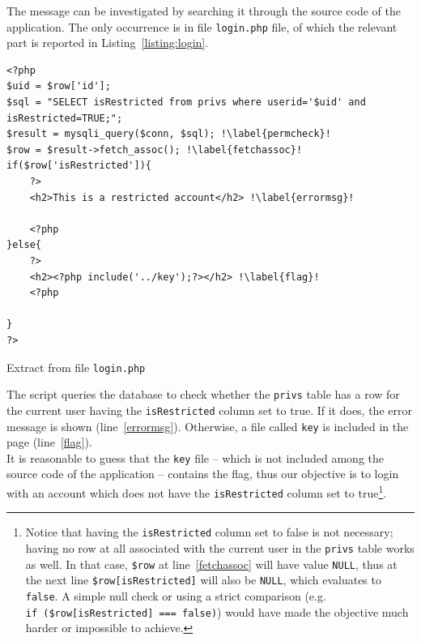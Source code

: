 The message can be investigated by searching it through the source code of the application. The only occurrence is in file \texttt{login.php} file, of which the relevant part is reported in Listing~\ref{listing:login}.

\begin{listing}[H]
\newenvironment{whitetext}{\par\color{white}}{\par}
\begin{whitetext}
\renewcommand{\theFancyVerbLine}{\rmfamily\textcolor{black}{\tiny{\arabic{FancyVerbLine}}}}
\begin{verbatim}
<?php
$uid = $row['id'];
$sql = "SELECT isRestricted from privs where userid='$uid' and isRestricted=TRUE;";
$result = mysqli_query($conn, $sql); !\label{permcheck}!
$row = $result->fetch_assoc(); !\label{fetchassoc}!
if($row['isRestricted']){
    ?>
    <h2>This is a restricted account</h2> !\label{errormsg}!

    <?php
}else{
    ?>
    <h2><?php include('../key');?></h2> !\label{flag}!
    <?php

}
?>
\end{verbatim}
\end{whitetext}
\caption{Extract from file \texttt{login.php}}
\label{listing:login}
\end{listing}

The script queries the database to check whether the \texttt{privs} table has a row for the current user having the \texttt{isRestricted} column set to true. If it does, the error message is shown (line~\ref{errormsg}). Otherwise, a file called \texttt{key} is included in the page (line~\ref{flag}). \\

It is reasonable to guess that the \texttt{key} file -- which is not included among the source code of the application -- contains the flag, thus our objective is to login with an account which does not have the \texttt{isRestricted} column set to true\footnote{Notice that having the \texttt{isRestricted} column set to false is not necessary; having no row at all associated with the current user in the \texttt{privs} table works as well. In that case, \texttt{\$row} at line~\ref{fetchassoc} will have value \texttt{NULL}, thus at the next line \texttt{\$row[\textquotesingle isRestricted\textquotesingle ]} will also be \texttt{NULL}, which evaluates to \texttt{false}. A simple null check or using a strict comparison (e.g. \texttt{if~(\$row[\textquotesingle isRestricted\textquotesingle ]~===~false)}) would have made the objective much harder or impossible to achieve.}. \\

